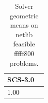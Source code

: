 \begin{table}
\caption{Solver geometric means on netlib feasible fffff800 problems.}
\label{t-netlib feasible fffff800-geom_mean}
\begin{tabular}{lc}
\toprule
SCS-3.0 \\
\midrule
1.00 \\
\bottomrule
\end{tabular}
\end{table}
